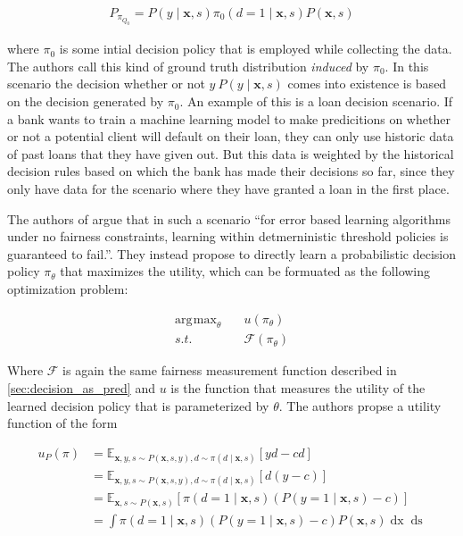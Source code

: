 \documentclass[
	a4paper,
	11pt
	]{article}
\DeclareMathOperator*{\argmax}{\arg\!\max}
\begin{document}
\begin{align*}
    P_{\pi_{Q_{0}}} = P(y \mid \boldsymbol{x}, s)\pi_{0}(d = 1 \mid \boldsymbol{x}, s)P(\boldsymbol{x}, s)
\end{align*}

where $\pi_{0}$ is some intial decision policy that is employed while collecting the data. The authors call this kind of ground truth distribution \textit{induced} by $\pi_0$. In this scenario the decision whether or not $y ~ P(y \mid \boldsymbol{x}, s)$ comes into existence is based on the decision generated by $\pi_{0}$. An example of this is a loan decision scenario. If a bank wants to train a machine learning model to make predicitions on whether or not a potential client will default on their loan, they can only use historic data of past loans that they have given out. But this data is weighted by the historical decision rules based on which the bank has made their decisions so far, since they only have data for the scenario where they have granted a loan in the first place.

The authors of \cite{Kilbertus19} argue that in such a scenario \enquote{for error based learning algorithms under no fairness constraints, learning within detmerninistic threshold policies is guaranteed to fail.}. They instead propose to directly learn a probabilistic decision policy $\pi_{\theta}$ that maximizes the utility, which can be formuated as the following optimization problem:

\begin{align*}
    \argmax_{\theta} &\quad u(\pi_{\theta}) \\
    s.t. &\quad \mathcal{F}(\pi_{\theta})
\end{align*}

Where $\mathcal{F}$ is again the same fairness measurement function described in \ref{sec:decision_as_pred} and $u$ is the function that measures the utility of the learned decision policy that is parameterized by $\theta$. The authors propse a utility function of the form 

\begin{align*}
    u_P(\pi) &= \mathbb{E}_{\boldsymbol{x},y,s \sim P(\boldsymbol{x}, s, y), d \sim \pi(d \mid \boldsymbol{x}, s)}[yd - cd] \\
    &= \mathbb{E}_{\boldsymbol{x},y,s \sim P(\boldsymbol{x}, s, y), d \sim \pi(d \mid \boldsymbol{x}, s)}[d(y - c)] \\
    &= \mathbb{E}_{\boldsymbol{x},s \sim P(\boldsymbol{x}, s)}[\pi(d = 1 \mid \boldsymbol{x}, s)(P(y = 1 \mid \boldsymbol{x}, s) - c)] \\
    &= \int \pi(d = 1 \mid \boldsymbol{x}, s)(P(y = 1 \mid \boldsymbol{x}, s) - c)P(\boldsymbol{x}, s) \mathop{dx} \mathop{ds}
\end{align*}
\end{document}
